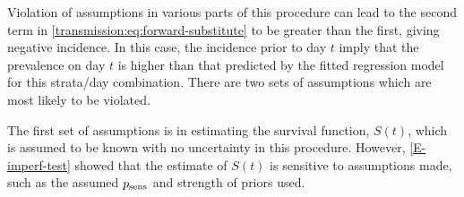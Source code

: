 \documentclass[thesis.tex]{subfiles}
\begin{document}

Violation of assumptions in various parts of this procedure can lead to the second term in \cref{transmission:eq:forward-substitute} to be greater than the first, giving negative incidence.
In this case, the incidence prior to day $t$ imply that the prevalence on day $t$ is higher than that predicted by the fitted regression model for this strata/day combination.
There are two sets of assumptions which are most likely to be violated.

The first set of assumptions is in estimating the survival function, $S(t)$, which is assumed to be known with no uncertainty in this procedure.
However, \cref{E-imperf-test} showed that the estimate of $S(t)$ is sensitive to assumptions made, such as the assumed $p_\text{sens}$ and strength of priors used.
\end{document}
